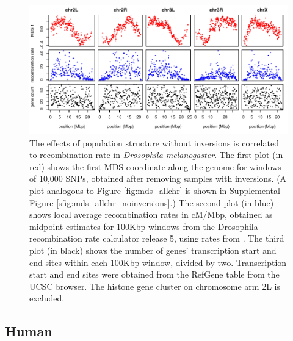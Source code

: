 \documentclass[11pt, oneside]{article}   	%
\begin{document}
\begin{figure}
    \begin{center}
        \includegraphics{drosophila_recomb_mds}
    \end{center}
    \caption{
        The effects of population structure without inversions is correlated to recombination rate in \textit{Drosophila melanogaster}.
        The first plot (in red) shows the first MDS coordinate along the genome 
        for windows of 10,000 SNPs,
        obtained after removing samples with inversions.
        (A plot analogous to Figure \ref{fig:mds_allchr} is shown
        in Supplemental Figure \ref{sfig:mds_allchr_noinversions}.)
        The second plot (in blue) shows
        local average recombination rates in cM/Mbp, obtained as midpoint estimates for 100Kbp windows 
        from the Drosophila recombination rate calculator \citep{fistonlavier2010drosophila} release 5,
        using rates from \citet{comeron2012many}.
        The third plot (in black) shows the number of genes' transcription start and end sites within each 100Kbp window, divided by two.
        Transcription start and end sites were obtained from the RefGene table from the UCSC browser. %
        The histone gene cluster on chromosome arm 2L is excluded.
        \label{fig:drosophila_recomb_rate}
    }
\end{figure}


\subsection{Human}
\end{document}
